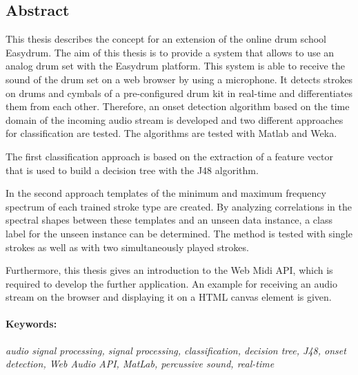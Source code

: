 \subsection*{Abstract}
\vspace{0.5cm}

This thesis describes the concept for an extension of the online drum school Easydrum. The aim of this thesis is to provide a system that allows to use an analog drum set with the Easydrum platform. This system is able to receive the sound of the drum set on a web browser by using a microphone. It detects strokes on drums and cymbals of a pre-configured drum kit in real-time and differentiates them from each other. Therefore, an onset detection algorithm based on the time domain of the incoming audio stream is developed and two different approaches for classification are tested. The algorithms are tested with Matlab\textsuperscript{\textregistered} and Weka. 

The first classification approach is based on the extraction of a feature vector that is used to build a decision tree with the J48 algorithm. 

In the second approach templates of the minimum and maximum frequency spectrum of each trained stroke type are created. By analyzing correlations in the spectral shapes between these templates and an unseen data instance, a class label for the unseen instance can be determined. The method is tested with single strokes as well as with two simultaneously played strokes. 

Furthermore, this thesis gives an introduction to the Web Midi API, which is required to develop the further application. An example for receiving an audio stream on the browser and displaying it on a HTML canvas element is given.

\paragraph{Keywords:}
\textit{audio signal processing, signal processing, classification, decision tree, J48, onset detection, Web Audio API, MatLab, percussive sound, real-time}

